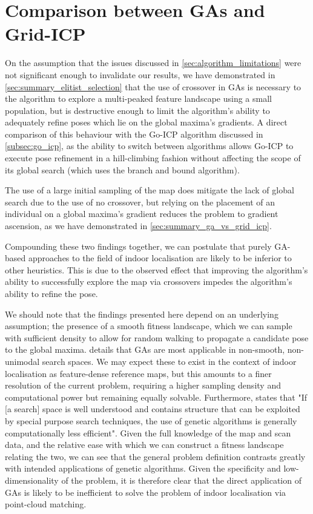 \documentclass[authoryearcitations]{UoYCSproject}
\begin{document}
\section{Comparison between GAs and Grid-ICP}
\label{sec:summary_ga_vs_grid_icp}
On the assumption that the issues discussed in \autoref{sec:algorithm_limitations} were not significant enough to invalidate our results, we have demonstrated in \autoref{sec:summary_elitist_selection} that the use of crossover in GAs is necessary to the algorithm to explore a multi-peaked feature landscape using a small population, but is destructive enough to limit the algorithm's ability to adequately refine poses which lie on the global maxima's gradients. A direct comparison of this behaviour with the Go-ICP algorithm discussed in \autoref{subsec:go_icp}, as the ability to switch between algorithms allows Go-ICP to execute pose refinement in a hill-climbing fashion without affecting the scope of its global search (which uses the branch and bound algorithm).\newline

The use of a large initial sampling of the map does mitigate the lack of global search due to the use of no crossover, but relying on the placement of an individual on a global maxima's gradient reduces the problem to gradient ascension, as we have demonstrated in \autoref{sec:summary_ga_vs_grid_icp}. \newline

Compounding these two findings together, we can postulate that purely GA-based approaches to the field of indoor localisation are likely to be inferior to other heuristics. This is due to the observed effect that improving the algorithm's ability to successfully explore the map via crossovers impedes the algorithm's ability to refine the pose.\newline

We should note that the findings presented here depend on an underlying assumption; the presence of a smooth fitness landscape, which we can sample with sufficient density to allow for random walking to propagate a candidate pose to the global maxima. \citet{Mitchell1998-td} details that GAs are most applicable in non-smooth, non-unimodal search spaces. We may expect these to exist in the context of indoor localisation as feature-dense reference maps, but this amounts to a finer resolution of the current problem, requiring a higher sampling density and computational power but remaining equally solvable. Furthermore, \citet{Grefenstette2012-ir} states that "If [a search] space is well understood and contains structure that can be exploited by special purpose search techniques, the use of genetic algorithms is generally computationally less efficient". Given the full knowledge of the map and scan data, and the relative ease with which we can construct a fitness landscape relating the two, we can see that the general problem definition contrasts greatly with intended applications of genetic algorithms. Given the specificity and low-dimensionality of the problem, it is therefore clear that the direct application of GAs is likely to be inefficient to solve the problem of indoor localisation via point-cloud matching. \newline
\end{document}
